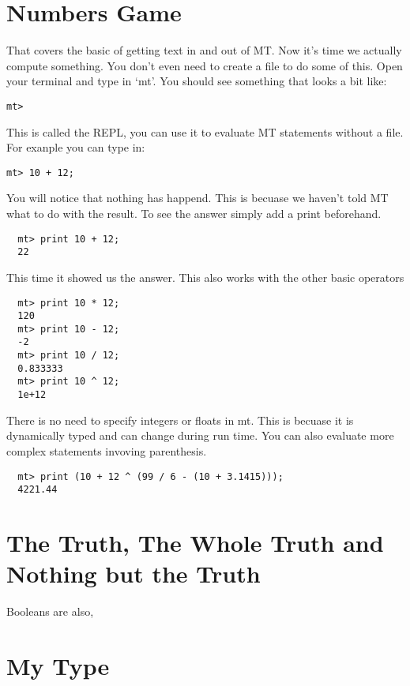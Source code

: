 \documentclass{report}
\begin{document}
\section{Numbers Game}
That covers the basic of getting text in and out of MT. Now it's time we actually compute something. You don't even need to create a file to do some of this. Open your terminal and type in `mt'. You should see something that looks a bit like:
\begin{lstlisting}
mt>
\end{lstlisting}
This is called the REPL, you can use it to evaluate MT statements without a file. For exanple you can type in:
\begin{lstlisting}
mt> 10 + 12;
\end{lstlisting}
You will notice that nothing has happend. This is becuase we haven't told MT what to do with the result. To see the answer simply add a print beforehand.
\begin{lstlisting}
  mt> print 10 + 12;
  22
\end{lstlisting}
This time it showed us the answer. This also works with the other basic operators
\begin{lstlisting}
  mt> print 10 * 12;
  120
  mt> print 10 - 12;
  -2
  mt> print 10 / 12;
  0.833333
  mt> print 10 ^ 12;
  1e+12
\end{lstlisting}
There is no need to specify integers or floats in mt. This is becuase it is dynamically typed and can change during run time. You can also evaluate more complex statements invoving parenthesis.
\begin{lstlisting}
  mt> print (10 + 12 ^ (99 / 6 - (10 + 3.1415)));
  4221.44
\end{lstlisting}

\section{The Truth, The Whole Truth and Nothing but the Truth}
Booleans are also,

\section{My Type}
\end{document}
